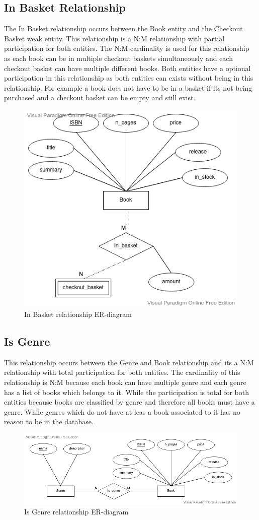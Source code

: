 \documentclass[fleqn]{scrreprt}
\begin{document}
\subsection{In Basket Relationship}
The In Basket relationship occurs between the Book entity and the Checkout Basket
weak entity. This relationship is a N:M relationship with partial participation
for both entities. The N:M cardinality is used for this relationship as each
book can be in multiple checkout baskets simultaneously and each checkout basket
can have multiple different books. Both entities have a optional participation
in this relationship as both entities can exists without being in this relationship.
For example a book does not have to be in a basket if its not being purchased
and a checkout basket can be empty and still exist.
\begin{figure}[h]\centering
    \includegraphics[width=.7\columnwidth]{er-diagram-project-In-Basket.vpd.png}
    \caption{In Basket relationship ER-diagram}\label{fig:erib}
\end{figure}

\subsection{Is Genre}
This relationship occurs between the Genre and Book relationship and its a N:M
relationship with total participation for both entities. The cardinality of
this relationship is N:M because each book can have multiple genre and each
genre has a list of books which belongs to it. While the participation is total
for both entities because books are classified by genre and therefore all books
must have a genre. While genres which do not have at leas a book associated to
it has no reason to be in the database.
\begin{figure}[ht]\centering
    \includegraphics[width=.7\columnwidth]{er-diagram-project-Is-Genre.vpd.png}
    \caption{Is Genre relationship ER-diagram}\label{fig:erig}
\end{figure}
\end{document}
